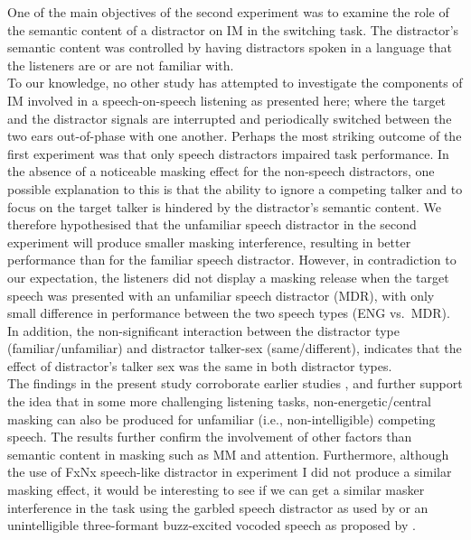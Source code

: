 \documentclass[a4paper, twoside]{templates/ociamthesis}
\begin{document}
One of the main objectives of the second experiment was to examine the role of the semantic content of a distractor on IM in the switching task. The distractor's semantic content was controlled by having distractors spoken in a language that the listeners are or are not familiar with.\\

To our knowledge, no other study has attempted to investigate the components of IM involved in a speech-on-speech listening as presented here; where the target and the distractor signals are interrupted and periodically switched between the two ears out-of-phase with one another. Perhaps the most striking outcome of the first experiment was that only speech distractors impaired task performance. In the absence of a noticeable masking effect for the non-speech distractors, one possible explanation to this is that the ability to ignore a competing talker and to focus on the target talker is hindered by the distractor's semantic content. We therefore hypothesised that the unfamiliar speech distractor in the second experiment will produce smaller masking interference, resulting in better performance than for the familiar speech distractor. However, in contradiction to our expectation, the listeners did not display a masking release when the target speech was presented with an unfamiliar speech distractor (MDR), with only small difference in performance between the two speech types (ENG vs.~MDR). In addition, the non-significant interaction between the distractor type (familiar/unfamiliar) and distractor talker-sex (same/different), indicates that the effect of distractor's talker sex was the same in both distractor types.\\

The findings in the present study corroborate earlier studies \autocite{Freyman2001,Brungart2002,Carlile2015,Summers2020}, and further support the idea that in some more challenging listening tasks, non-energetic/central masking can also be produced for unfamiliar (i.e., non-intelligible) competing speech. The results further confirm the involvement of other factors than semantic content in masking such as MM and attention. Furthermore, although the use of FxNx speech-like distractor in experiment I did not produce a similar masking effect, it would be interesting to see if we can get a similar masker interference in the task using the garbled speech distractor as used by \textcite{Carlile2015} or an unintelligible three-formant buzz-excited vocoded speech as proposed by \textcite{Summers2020}.\\
\end{document}
